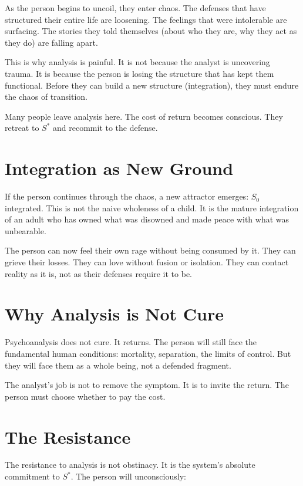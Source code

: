 \documentclass[12pt]{article}
\begin{document}
As the person begins to uncoil, they enter chaos. The defenses that have structured their entire life are loosening. The feelings that were intolerable are surfacing. The stories they told themselves (about who they are, why they act as they do) are falling apart.

This is why analysis is painful. It is not because the analyst is uncovering trauma. It is because the person is losing the structure that has kept them functional. Before they can build a new structure (integration), they must endure the chaos of transition.

Many people leave analysis here. The cost of return becomes conscious. They retreat to $S^*$ and recommit to the defense.

\section{Integration as New Ground}

If the person continues through the chaos, a new attractor emerges: $S_0$ integrated. This is not the naive wholeness of a child. It is the mature integration of an adult who has owned what was disowned and made peace with what was unbearable.

The person can now feel their own rage without being consumed by it. They can grieve their losses. They can love without fusion or isolation. They can contact reality as it is, not as their defenses require it to be.

\section{Why Analysis is Not Cure}

Psychoanalysis does not cure. It returns. The person will still face the fundamental human conditions: mortality, separation, the limits of control. But they will face them as a whole being, not a defended fragment.

The analyst's job is not to remove the symptom. It is to invite the return. The person must choose whether to pay the cost.

\section{The Resistance}

The resistance to analysis is not obstinacy. It is the system's absolute commitment to $S^*$. The person will unconsciously:
\end{document}
